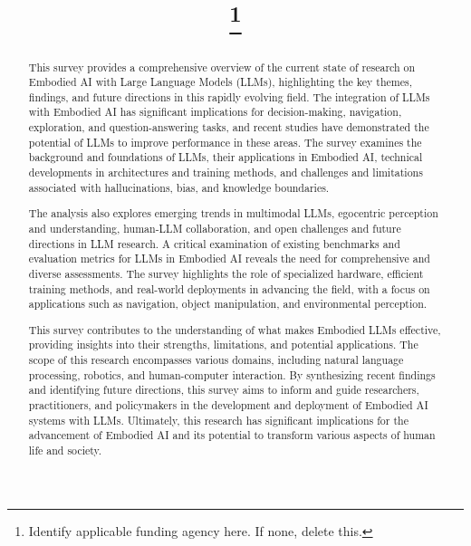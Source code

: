\documentclass[conference]{IEEEtran}
\begin{document}
\title{
\thanks{Identify applicable funding agency here. If none, delete this.}
}

\author{
\and
{}
}

\maketitle

\begin{abstract}
This survey provides a comprehensive overview of the current state of research on Embodied AI with Large Language Models (LLMs), highlighting the key themes, findings, and future directions in this rapidly evolving field. The integration of LLMs with Embodied AI has significant implications for decision-making, navigation, exploration, and question-answering tasks, and recent studies have demonstrated the potential of LLMs to improve performance in these areas. The survey examines the background and foundations of LLMs, their applications in Embodied AI, technical developments in architectures and training methods, and challenges and limitations associated with hallucinations, bias, and knowledge boundaries.

The analysis also explores emerging trends in multimodal LLMs, egocentric perception and understanding, human-LLM collaboration, and open challenges and future directions in LLM research. A critical examination of existing benchmarks and evaluation metrics for LLMs in Embodied AI reveals the need for comprehensive and diverse assessments. The survey highlights the role of specialized hardware, efficient training methods, and real-world deployments in advancing the field, with a focus on applications such as navigation, object manipulation, and environmental perception.

This survey contributes to the understanding of what makes Embodied LLMs effective, providing insights into their strengths, limitations, and potential applications. The scope of this research encompasses various domains, including natural language processing, robotics, and human-computer interaction. By synthesizing recent findings and identifying future directions, this survey aims to inform and guide researchers, practitioners, and policymakers in the development and deployment of Embodied AI systems with LLMs. Ultimately, this research has significant implications for the advancement of Embodied AI and its potential to transform various aspects of human life and society.
\end{abstract}
\end{document}
